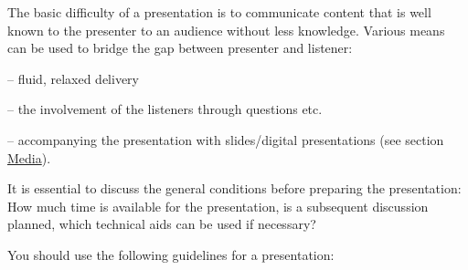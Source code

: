 \documentclass[
  english,
]{scrreprt}
\begin{document}
The basic difficulty of a presentation is to communicate content that is well known to the presenter to an audience without less knowledge. Various means can be used to bridge the gap between presenter and listener:

– fluid, relaxed delivery

– the involvement of the listeners through questions etc.

– accompanying the presentation with slides/digital presentations (see section \href{sec:media}{Media}).

It is essential to discuss the general conditions before preparing the presentation: How much time is available for the presentation, is a subsequent discussion planned, which technical aids can be used if necessary?

You should use the following guidelines for a presentation:
\end{document}
